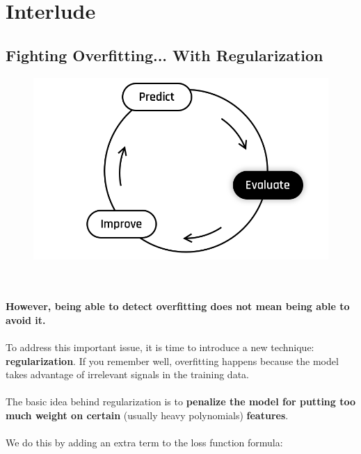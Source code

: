 
\section*{Interlude}
\subsection*{Fighting Overfitting... With Regularization}

\begin{figure}[!h]
    \centering
    \includegraphics[scale=0.25]{assets/Evaluate.png}
\end{figure}
\\
\\
\textbf{However, being able to detect overfitting does not mean being able to avoid it.}\\
\\
To address this important issue, it is time to introduce a new technique: \textbf{regularization}.
If you remember well, overfitting happens because the model takes advantage of irrelevant 
signals in the training data.\\
\\
The basic idea behind regularization is to \textbf{penalize the model for putting too 
much weight on certain} (usually heavy polynomials) \textbf{features}.\\
\\
We do this by adding an extra term to the loss function formula:


